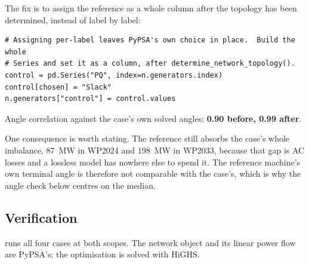 \documentclass[11pt,a4paper]{article}
\begin{document}
The fix is to assign the reference as a whole column after the topology has
been determined, instead of label by label:

\begin{lstlisting}
# Assigning per-label leaves PyPSA's own choice in place.  Build the whole
# Series and set it as a column, after determine_network_topology().
control = pd.Series("PQ", index=n.generators.index)
control[chosen] = "Slack"
n.generators["control"] = control.values
\end{lstlisting}

Angle correlation against the case's own solved angles: \textbf{0.90 before,
0.99 after}.

One consequence is worth stating. The reference still absorbs the case's whole
imbalance, 87~MW in WP2024 and 198~MW in WP2033, because that gap is AC losses
and a lossless model has nowhere else to spend it. The reference machine's own
terminal angle is therefore not comparable with the case's, which is why the
angle check below centres on the median.


\subsection{Verification}
\label{sec:verify}

 runs all four cases at both scopes. The
network object and its linear power flow are PyPSA's; the
optimisation is solved with HiGHS.
\end{document}
